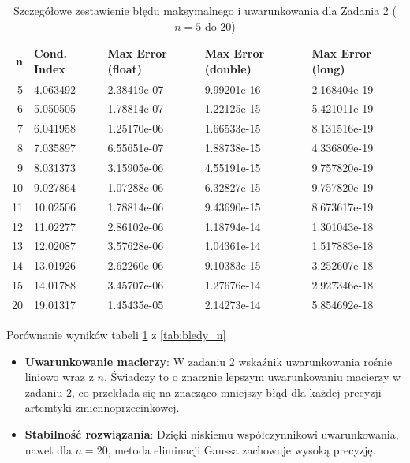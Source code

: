 \documentclass[twoside]{article}
\begin{document}
\begin{table}[h!]
\centering
\begin{tabular}{|r||l|l|l|l|}
\hline
\textbf{n} & \textbf{Cond. Index} & \textbf{Max Error (float)} & \textbf{Max Error (double)} & \textbf{Max Error (long)} \\ \hline
5  & 4.063492 & 2.38419e-07 & 9.99201e-16 & 2.168404e-19  \\ \hline \hline
6  & 5.050505 & 1.78814e-07 & 1.22125e-15 & 5.421011e-19  \\ \hline
7  & 6.041958 & 1.25170e-06 & 1.66533e-15 & 8.131516e-19 \\ \hline
8  & 7.035897 & 6.55651e-07 & 1.88738e-15 & 4.336809e-19  \\ \hline
9  & 8.031373 & 3.15905e-06 & 4.55191e-15 & 9.757820e-19  \\ \hline
10 & 9.027864 & 1.07288e-06 & 6.32827e-15 & 9.757820e-19  \\ \hline
11 & 10.02506 & 1.78814e-06 & 9.43690e-15 & 8.673617e-19  \\ \hline
12 & 11.02277 & 2.86102e-06 & 1.18794e-14 & 1.301043e-18  \\ \hline
13 & 12.02087 & 3.57628e-06 & 1.04361e-14 & 1.517883e-18  \\ \hline
14 & 13.01926 & 2.62260e-06 & 9.10383e-15 & 3.252607e-18  \\ \hline
15 & 14.01788 & 3.45707e-06 & 1.27676e-14 & 2.927346e-18  \\ \hline
20 & 19.01317 & 1.45435e-05 & 2.14273e-14 & 5.854692e-18  \\ \hline
\end{tabular}
\caption{Szczegółowe zestawienie błędu maksymalnego i uwarunkowania dla Zadania 2 ($n=5$ do $20$)}
\label{tab:bledy_zad2_full}
\end{table}

Porównanie wyników tabeli \ref{tab:bledy_zad2_full} z \ref{tab:bledy_n}
\begin{itemize}
    \item \textbf{Uwarunkowanie macierzy}: W zadaniu 2 wskaźnik uwarunkowania rośnie liniowo wraz z $n$. Świadczy to o znacznie lepszym
    uwarunkowaniu macierzy w zadaniu 2, co przekłada się na znacząco mniejszy błąd dla każdej precyzji artemtyki zmiennoprzecinkowej.
    \item \textbf{Stabilność rozwiązania}: Dzięki niskiemu współczynnikowi uwarunkowania, nawet dla $n=20$, metoda eliminacji Gaussa zachowuje wysoką precyzję.

\end{itemize}
\end{document}

